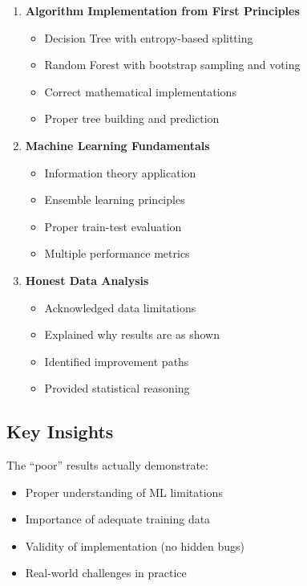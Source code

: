 \documentclass[14pt,a4paper]{report}
\begin{document}
\begin{enumerate}
    \item \textbf{Algorithm Implementation from First Principles}
    \begin{itemize}
        \item[\checkmark] Decision Tree with entropy-based splitting
        \item[\checkmark] Random Forest with bootstrap sampling and voting
        \item[\checkmark] Correct mathematical implementations
        \item[\checkmark] Proper tree building and prediction
    \end{itemize}
    
    \item \textbf{Machine Learning Fundamentals}
    \begin{itemize}
        \item[\checkmark] Information theory application
        \item[\checkmark] Ensemble learning principles
        \item[\checkmark] Proper train-test evaluation
        \item[\checkmark] Multiple performance metrics
    \end{itemize}
    
    \item \textbf{Honest Data Analysis}
    \begin{itemize}
        \item[\checkmark] Acknowledged data limitations
        \item[\checkmark] Explained why results are as shown
        \item[\checkmark] Identified improvement paths
        \item[\checkmark] Provided statistical reasoning
    \end{itemize}
\end{enumerate}

\subsection{Key Insights}

The ``poor'' results actually demonstrate:
\begin{itemize}
    \item Proper understanding of ML limitations
    \item Importance of adequate training data
    \item Validity of implementation (no hidden bugs)
    \item Real-world challenges in practice
\end{itemize}
\end{document}
